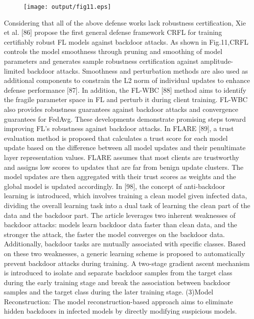 \begin{figure}[h]
    \centering
    \texttt{[image: output/fig11.eps]}
     \caption{}
     \label{fig11}
\end{figure}

Considering that all of the above defense works lack
robustness certification, Xie et al. [86] propose the first
general defense framework CRFL for training certifiably
robust FL models against backdoor attacks. As shown
in Fig.11,CRFL controls the model smoothness through
pruning and smoothing of model parameters and generates
sample robustness certification against amplitude-limited
backdoor attacks. Smoothness and perturbation methods
are also used as additional components to constrain
the L2 norm of individual updates to enhance defense performance [87].
In addition, the FL-WBC [88] method aims to identify
the fragile parameter space in FL and perturb it during
client training. FL-WBC also provides robustness
guarantees against backdoor attacks and convergence guarantees
for FedAvg. These developments demonstrate promising
steps toward improving FL's robustness against backdoor
attacks. In FLARE [89], a trust evaluation method is
proposed that calculates a trust score for each model
update based on the difference between all model updates
and their penultimate layer representation values. FLARE
assumes that most clients are trustworthy and assigns
low scores to updates that are far from benign update
clusters. The model updates are then aggregated with their
trust scores as weights and the global model is updated
accordingly. In [98], the concept of anti-backdoor learning is
introduced, which involves training a clean model given
infected data, dividing the overall learning task into a
dual task of learning the clean part of the data and
the backdoor part. The article leverages two inherent
weaknesses of backdoor attacks: models learn backdoor
data faster than clean data, and the stronger the attack,
the faster the model converges on the backdoor data.
Additionally, backdoor tasks are mutually associated with
specific classes. Based on these two weaknesses, a generic
learning scheme is proposed to automatically prevent
backdoor attacks during training. A two-stage gradient
ascent mechanism is introduced to isolate and separate
backdoor samples from the target class during the early
training stage and break the association between backdoor
samples and the target class during the later training
stage.  
(3)Model Reconstruction: The model reconstruction-based
approach aims to eliminate hidden backdoors in infected
models by directly modifying suspicious models.
